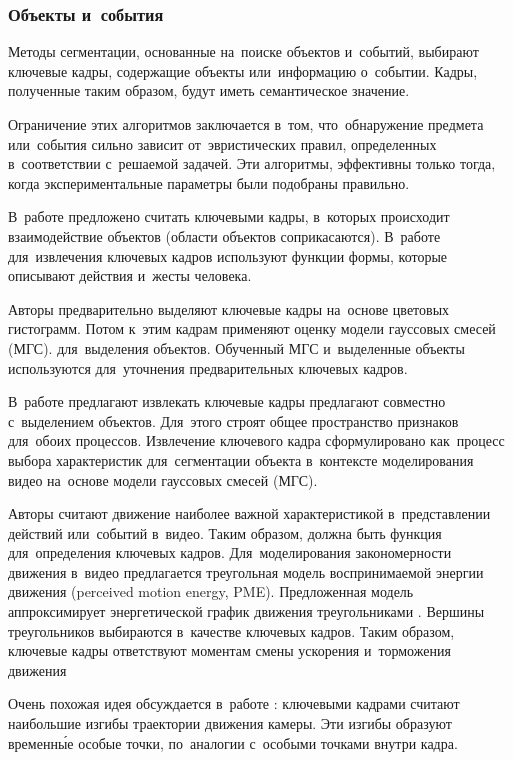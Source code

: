 \subsubsection{Объекты и~события}

Методы сегментации, основанные на~поиске объектов и~событий, выбирают
ключевые кадры, содержащие объекты или~информацию о~событии.
Кадры, полученные таким образом, будут иметь семантическое значение.

Ограничение этих алгоритмов заключается в~том,
что~обнаружение предмета или~события сильно зависит
от~эвристических правил, определенных в~соответствии с~решаемой задачей.
Эти алгоритмы, эффективны только тогда,
когда экспериментальные параметры были подобраны правильно.

В~работе \cite{Calic:2004} предложено считать ключевыми кадры,
в~которых происходит взаимодействие объектов (области объектов соприкасаются).
В~работе \cite{Kim:2001} для~извлечения ключевых кадров
используют функции формы, которые описывают действия и~жесты человека.

Авторы \cite{Liu:2005} предварительно выделяют ключевые кадры
на~основе цветовых гистограмм. Потом к~этим кадрам применяют
оценку модели гауссовых смесей
(МГС).
для~выделения объектов. Обученный МГС и~выделенные объекты
используются для~уточнения предварительных ключевых кадров.

В~работе \cite{Song:2006} предлагают извлекать ключевые кадры предлагают
совместно с~выделением объектов.
Для~этого строят общее пространство признаков для~обоих процессов.
Извлечение ключевого кадра сформулировано как~процесс выбора характеристик
для~сегментации объекта в~контексте моделирования видео на~основе
модели гауссовых смесей (МГС).

Авторы \cite{Liu:2003} считают движение наиболее важной характеристикой
в~представлении действий или~событий в~видео.
Таким образом, должна быть функция для~определения ключевых кадров.
Для~моделирования закономерности движения в~видео
предлагается {треугольная модель}
воспринимаемой энергии движения
(perceived motion energy, PME).
Предложенная модель аппроксимирует энергетической
график движения треугольниками \cite{Zhang:2008}.
Вершины треугольников выбираются в~качестве ключевых кадров.
Таким образом, ключевые кадры ответствуют моментам смены
ускорения и~торможения движения

Очень похожая идея обсуждается в~работе \cite{Han:2005}:
ключевыми кадрами считают наибольшие изгибы траектории движения камеры.
Эти изгибы образуют временны́е особые точки,
по~аналогии с~особыми точками внутри кадра.



